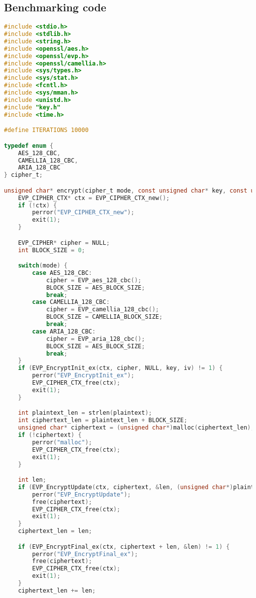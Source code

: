 \documentclass{article}
\begin{document}
\subsection{Benchmarking code}
\begin{lstlisting}[language=C]
#include <stdio.h>
#include <stdlib.h>
#include <string.h>
#include <openssl/aes.h>
#include <openssl/evp.h>
#include <openssl/camellia.h>
#include <sys/types.h>
#include <sys/stat.h>
#include <fcntl.h>
#include <sys/mman.h>
#include <unistd.h>
#include "key.h"
#include <time.h>

#define ITERATIONS 10000

typedef enum {
    AES_128_CBC,
    CAMELLIA_128_CBC,
    ARIA_128_CBC
} cipher_t;

unsigned char* encrypt(cipher_t mode, const unsigned char* key, const unsigned char* iv, const char* plaintext, int* out_len) {
    EVP_CIPHER_CTX* ctx = EVP_CIPHER_CTX_new();
    if (!ctx) {
        perror("EVP_CIPHER_CTX_new");
        exit(1);
    }

    EVP_CIPHER* cipher = NULL;
    int BLOCK_SIZE = 0;

    switch(mode) {
        case AES_128_CBC:
            cipher = EVP_aes_128_cbc();
            BLOCK_SIZE = AES_BLOCK_SIZE;
            break;
        case CAMELLIA_128_CBC:
            cipher = EVP_camellia_128_cbc();
            BLOCK_SIZE = CAMELLIA_BLOCK_SIZE;
            break;
        case ARIA_128_CBC:
            cipher = EVP_aria_128_cbc();
            BLOCK_SIZE = AES_BLOCK_SIZE;
            break;
    }
    if (EVP_EncryptInit_ex(ctx, cipher, NULL, key, iv) != 1) {
        perror("EVP_EncryptInit_ex");
        EVP_CIPHER_CTX_free(ctx);
        exit(1);
    }

    int plaintext_len = strlen(plaintext);
    int ciphertext_len = plaintext_len + BLOCK_SIZE;
    unsigned char* ciphertext = (unsigned char*)malloc(ciphertext_len);
    if (!ciphertext) {
        perror("malloc");
        EVP_CIPHER_CTX_free(ctx);
        exit(1);
    }

    int len;
    if (EVP_EncryptUpdate(ctx, ciphertext, &len, (unsigned char*)plaintext, plaintext_len) != 1) {
        perror("EVP_EncryptUpdate");
        free(ciphertext);
        EVP_CIPHER_CTX_free(ctx);
        exit(1);
    }
    ciphertext_len = len;

    if (EVP_EncryptFinal_ex(ctx, ciphertext + len, &len) != 1) {
        perror("EVP_EncryptFinal_ex");
        free(ciphertext);
        EVP_CIPHER_CTX_free(ctx);
        exit(1);
    }
    ciphertext_len += len;


\end{lstlisting}
\end{document}
